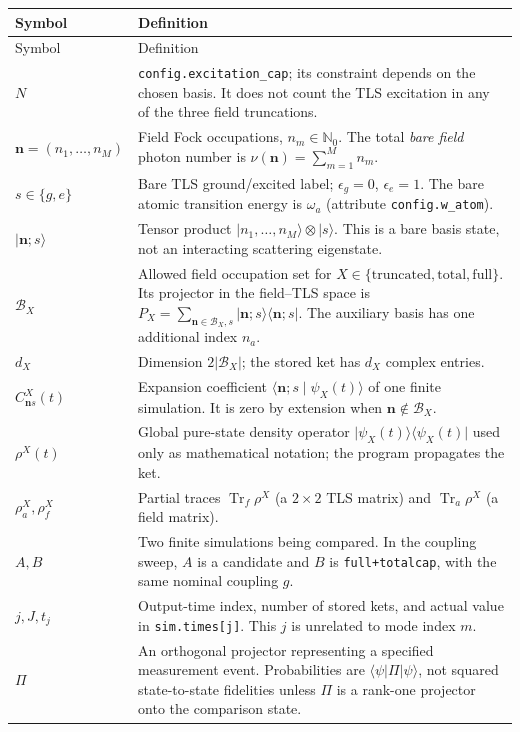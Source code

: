 \documentclass[11pt,a4paper]{article}
\newcommand{\ket}[1]{\lvert #1\rangle}
\newcommand{\bra}[1]{\langle #1\rvert}
\newcommand{\braket}[2]{\langle #1\mid #2\rangle}
\newcommand{\code}[1]{\nolinkurl{#1}}
\newcommand{\Tr}{\operatorname{Tr}}
\newcommand{\BB}{\mathcal B}
\begin{document}
\begin{center}\small
\begin{longtable}{p{}p{}}
\toprule Symbol & Definition\\\midrule\endfirsthead
\toprule Symbol & Definition\\\midrule\endhead
$N$ & \code{config.excitation_cap}; its constraint depends on the chosen basis. It does not count the TLS excitation in any of the three field truncations.\\
$\mathbf n=(n_1,\ldots,n_M)$ & Field Fock occupations, $n_m\in\mathbb N_0$. The total \emph{bare field} photon number is $\nu(\mathbf n)=\sum_{m=1}^M n_m$.\\
$s\in\{g,e\}$ & Bare TLS ground/excited label; $\epsilon_g=0$, $\epsilon_e=1$. The bare atomic transition energy is $\omega_a$ (attribute \code{config.w_atom}).\\
$\ket{\mathbf n;s}$ & Tensor product $\ket{n_1,\ldots,n_M}\otimes\ket s$. This is a bare basis state, not an interacting scattering eigenstate.\\
$\BB_X$ & Allowed field occupation set for $X\in\{\mathrm{truncated,total,full}\}$. Its projector in the field--TLS space is $P_X=\sum_{\mathbf n\in\BB_X,s}\ket{\mathbf n;s}\bra{\mathbf n;s}$. The auxiliary basis has one additional index $n_a$.\\
$d_X$ & Dimension $2|\BB_X|$; the stored ket has $d_X$ complex entries.\\
$C^X_{\mathbf n s}(t)$ & Expansion coefficient $\braket{\mathbf n;s}{\psi_X(t)}$ of one finite simulation. It is zero by extension when $\mathbf n\notin\BB_X$.\\
$\rho^X(t)$ & Global pure-state density operator $\ket{\psi_X(t)}\bra{\psi_X(t)}$ used only as mathematical notation; the program propagates the ket.\\
$\rho_a^X,\rho_f^X$ & Partial traces $\Tr_f\rho^X$ (a $2\times2$ TLS matrix) and $\Tr_a\rho^X$ (a field matrix).\\
$A,B$ & Two finite simulations being compared. In the coupling sweep, $A$ is a candidate and $B$ is \code{full+totalcap}, with the same nominal coupling $g$.\\
$j,J,t_j$ & Output-time index, number of stored kets, and actual value in \code{sim.times[j]}. This $j$ is unrelated to mode index $m$.\\
$\Pi$ & An orthogonal projector representing a specified measurement event. Probabilities are $\bra\psi\Pi\ket\psi$, not squared state-to-state fidelities unless $\Pi$ is a rank-one projector onto the comparison state.\\
\bottomrule
\end{longtable}
\end{center}
\end{document}
